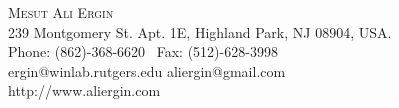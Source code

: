 \documentclass[10pt]{article}
\begin{document}

\begin{center}

\Large{\textsc{Mesut Ali Ergin}}\\
\vspace{2mm} \normalsize
  239 Montgomery St. Apt. 1E, Highland Park, NJ 08904, USA.\\
Phone: (862)-368-6620 \  Fax: (512)-628-3998\\
  ergin@winlab.rutgers.edu \hspace{5mm} aliergin@gmail.com \\
  http://www.aliergin.com
\end{center}



\end{document}
